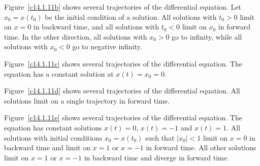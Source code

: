 \documentclass{ximera}
\begin{document}
\begin{figure}[htb]
                       \centerline{%
                       }
\end{figure}

 Figure~\ref{c14.1.11b} shows several trajectories of the
differential equation.  Let $x_0 = x(t_0)$ be the initial condition of
a solution.  All solutions with $t_0 > 0$ limit on $x = 0$ in backward time,
and all solutions with $t_0 < 0$ limit on $x_0$ in forward time.  In the
other direction, all solutions with $x_0 > 0$ go to infinity, while all
solutions with $x_0 < 0$ go to negative infinity.

\begin{figure}[htb]
                       \centerline{%
                       }
\end{figure}

 Figure~\ref{c14.1.11c} shows several trajectories of the
differential equation.  The equation has a constant solution at $x(t)
= x_0 = 0$.

\begin{figure}[htb]
                       \centerline{%
                       }
\end{figure}

 Figure~\ref{c14.1.11d} shows several trajectories of the
differential equation.  All solutions limit on a single trajectory in
forward time.

\begin{figure}[htb]
                       \centerline{%
                       }
\end{figure}

 Figure~\ref{c14.1.11e} shows several trajectories of the
differential equation.  The equation has constant solutions $x(t) = 0$,
$x(t) = -1$ and $x(t) = 1$.  All solutions with initial conditions
$x_0 = x(t_0)$ such that $|x_0| < 1$ limit on $x = 0$ in backward time and
limit on $x = 1$ or $x = -1$ in forward time.  All other solutions limit
on $x = 1$ or $x = -1$ in backward time and diverge in forward time.

\begin{figure}[htb]
                       \centerline{%
                       }
\end{figure}
\end{document}

